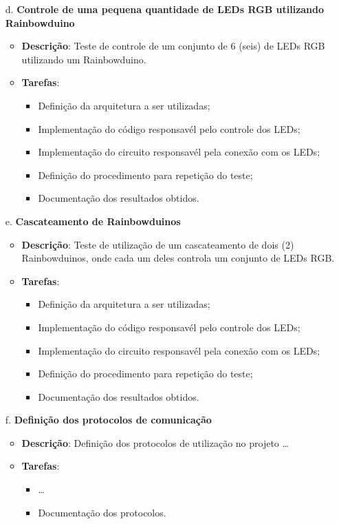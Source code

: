 \documentclass[a4paper,10pt]{article}
\begin{document}
\begin{enumerate}
    \item[d.] {\bf Controle de uma pequena quantidade de LEDs RGB utilizando Rainbowduino}
	\begin{itemize}
	    \item {\bf Descrição}: Teste de controle de um conjunto de 6 (seis) de LEDs RGB utilizando um Rainbowduino.
	    \item {\bf Tarefas}:
		\begin{itemize}
		    \item Definição da arquitetura a ser utilizadas;
		    \item Implementação do código responsavél pelo controle dos LEDs;
		    \item Implementação do circuito responsavél pela conexão com os LEDs;		    
		    \item Definição do procedimento para repetição do teste;
		    \item Documentação dos resultados obtidos.
		\end{itemize}
	\end{itemize}    
    
    \item[e.] {\bf Cascateamento de Rainbowduinos}
	\begin{itemize}
	    \item {\bf Descrição}: Teste de utilização de um cascateamento de dois (2) Rainbowduinos, onde cada um deles controla um conjunto de LEDs RGB.
	    \item {\bf Tarefas}:
		\begin{itemize}
		    \item Definição da arquitetura a ser utilizadas;
		    \item Implementação do código responsavél pelo controle dos LEDs;
		    \item Implementação do circuito responsavél pela conexão com os LEDs;		    
		    \item Definição do procedimento para repetição do teste;
		    \item Documentação dos resultados obtidos.
		\end{itemize}
	\end{itemize}
    
    
    \item[f.] {\bf Definição dos protocolos de comunicação}
	\begin{itemize}
	    \item {\bf Descrição}: Definição dos protocolos de utilização no projeto \ldots
	    \item {\bf Tarefas}:
		\begin{itemize}
		    \item \ldots
		    \item Documentação dos protocolos.
		\end{itemize}
	\end{itemize}

\end{enumerate}
\end{document}

